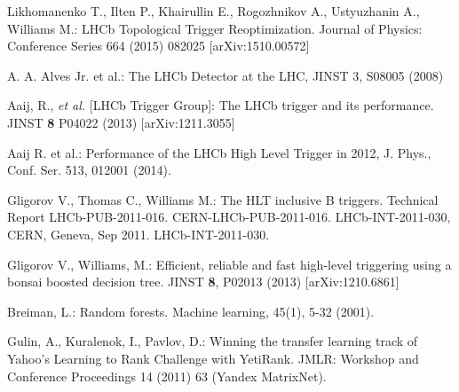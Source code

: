 \documentclass{llncs}
\begin{document}
\begin{thebibliography}{5}
%
 Likhomanenko T., Ilten P., Khairullin E., Rogozhnikov A., Ustyuzhanin A., Williams M.: 
LHCb Topological Trigger Reoptimization. Journal of Physics: Conference Series 664 (2015) 082025 [arXiv:1510.00572]

  A. A. Alves Jr. et al.: The LHCb Detector at the LHC, JINST 3, S08005 (2008)

 Aaij, R., {\em et al.} [LHCb Trigger Group]: 
The LHCb trigger and its performance.
JINST {\bf 8} P04022 (2013) [arXiv:1211.3055]

 Aaij R. et al.: 
Performance of the LHCb High Level Trigger in 2012, J. Phys., Conf. Ser. 513, 012001 (2014).

 Gligorov V., Thomas C., Williams M.: 
The HLT inclusive B triggers. Technical Report
LHCb-PUB-2011-016. CERN-LHCb-PUB-2011-016. LHCb-INT-2011-030, CERN, Geneva, Sep 2011. LHCb-INT-2011-030.

 Gligorov V., Williams, M.:
Efficient, reliable and fast high-level triggering using a bonsai boosted decision tree.
JINST {\bf 8}, P02013 (2013) [arXiv:1210.6861]

 Breiman, L.: 
Random forests. Machine learning, 45(1), 5-32 (2001).

 Gulin, A., Kuralenok, I., Pavlov, D.:
Winning the transfer learning track of Yahoo's Learning to Rank Challenge with YetiRank.
JMLR: Workshop and Conference Proceedings 14 (2011) 63 (Yandex MatrixNet).






\end{thebibliography}
\end{document}
